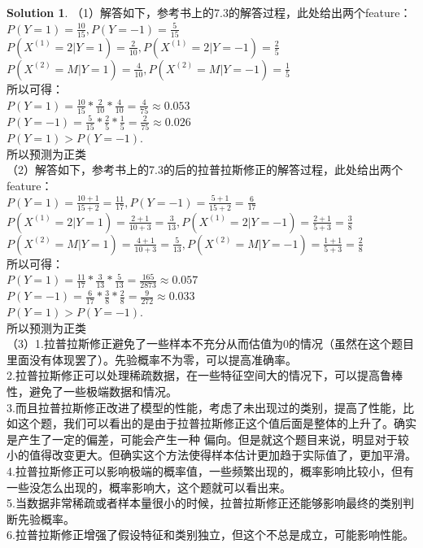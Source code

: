 \documentclass[a4paper,UTF8]{article}
\numberwithin{equation}{section}
\theoremstyle{definition}
\newtheorem*{solution}{Solution}
\begin{document}
 
\begin{solution}
    （1）解答如下，参考书上的7.3的解答过程，此处给出两个feature：\\
    $P(Y=1)=\frac{10}{15},P(Y=-1)=\frac{5}{15}$\\
    $P(X^{(1)}=2|Y=1) = \frac{2}{10}, P(X^{(1)}=2|Y=-1) = \frac{2}{5}$\\
    $P(X^{(2)}=M|Y=1) = \frac{4}{10}, P(X^{(2)}=M|Y=-1) = \frac{1}{5}$\\
    所以可得：\\
    $P(Y=1)=\frac{10}{15} *\frac{2}{10} *\frac{4}{10} = \frac{4}{75} \approx 0.053$\\
    $P(Y=-1)=\frac{5}{15} *\frac{2}{5} *\frac{1}{5} = \frac{2}{75} \approx 0.026$\\
    $P(Y=1) > P(Y=-1)$.\\
    所以预测为正类\\
    （2）解答如下，参考书上的7.3的后的拉普拉斯修正的解答过程，此处给出两个feature：\\
    $P(Y=1)=\frac{10+1}{15+2} = \frac{11}{17},P(Y=-1)=\frac{5+1}{15+2} = \frac{6}{17}$\\
    $P(X^{(1)}=2|Y=1) = \frac{2+1}{10+3} = \frac{3}{13}, P(X^{(1)}=2|Y=-1) = \frac{2+1}{5+3} = \frac{3}{8}$\\
    $P(X^{(2)}=M|Y=1) = \frac{4+1}{10+3} = \frac{5}{13}, P(X^{(2)}=M|Y=-1) = \frac{1+1}{5+3} = \frac{2}{8}$\\
    所以可得：\\
    $P(Y=1)=\frac{11}{17} *\frac{3}{13} *\frac{5}{13} = \frac{165}{2873} \approx 0.057$\\
    $P(Y=-1)=\frac{6}{17} *\frac{3}{8} *\frac{2}{8} = \frac{9}{272} \approx 0.033$\\
    $P(Y=1) > P(Y=-1)$.\\
    所以预测为正类\\
    （3）1.拉普拉斯修正避免了一些样本不充分从而估值为0的情况（虽然在这个题目里面没有体现罢了）。先验概率不为零，可以提高准确率。\\
    2.拉普拉斯修正可以处理稀疏数据，在一些特征空间大的情况下，可以提高鲁棒性，避免了一些极端数据和情况。\\
    3.而且拉普拉斯修正改进了模型的性能，考虑了未出现过的类别，提高了性能，比如这个题，我们可以看出的是由于拉普拉斯修正这个值后面是整体的上升了。确实是产生了一定的偏差，可能会产生一种
    偏向。但是就这个题目来说，明显对于较小的值得改变更大。但确实这个方法使得样本估计更加趋于实际值了，更加平滑。\\
    4.拉普拉斯修正可以影响极端的概率值，一些频繁出现的，概率影响比较小，但有一些没怎么出现的，概率影响大，这个题就可以看出来。\\
    5.当数据非常稀疏或者样本量很小的时候，拉普拉斯修正还能够影响最终的类别判断先验概率。\\
    6.拉普拉斯修正增强了假设特征和类别独立，但这个不总是成立，可能影响性能。
\end{solution}
\end{document}
